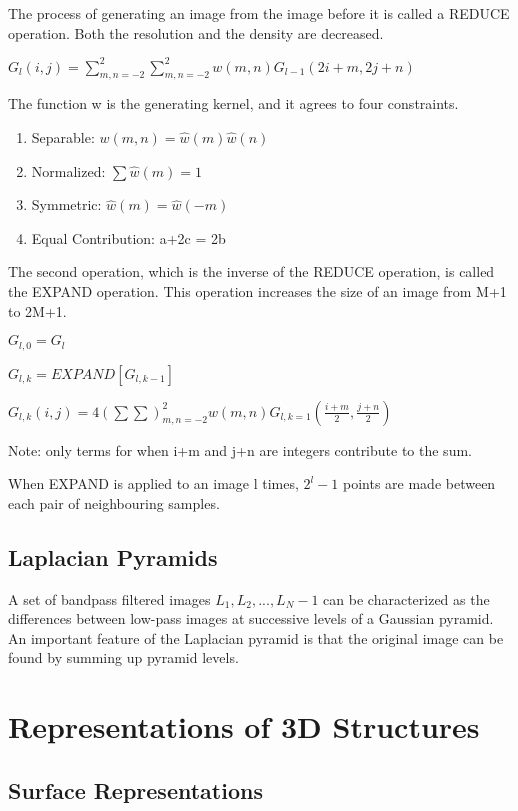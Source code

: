 \documentclass{article}
\begin{document}
\begin{multicols}{2}
The process of generating an image from the image before it is called a REDUCE operation. Both the resolution and the density are decreased.

$G_l(i,j) = \sum _{m,n = -2}^2 \sum _{m,n = -2}^2 w(m,n) G_{l-1} (2i+m, 2j+n)$

The function w is the generating kernel, and it agrees to four constraints.

\begin{enumerate}
  \item {Separable: $w(m,n) = \hat{w}(m)\hat{w}(n)$}
  \item {Normalized: $\sum \hat{w}(m) = 1$}
  \item {Symmetric: $\hat{w}(m) = \hat{w}(-m)$}
  \item {Equal Contribution: a+2c = 2b}
\end{enumerate}

The second operation, which is the inverse of the REDUCE operation, is called the EXPAND operation. This operation increases the size of an image from M+1 to 2M+1.

$G_{l,0} = G_l$

$G_{l,k} = EXPAND[G_{l,k-1}]$

$G_{l,k}(i,j) = 4(\sum \sum)_{m,n = -2}^2 w(m,n) G_{l,k=1}(\frac{i+m}{2}, \frac{j+n}{2})$ 

Note: only terms for when i+m and j+n are integers contribute to the sum.

When EXPAND is applied to an image l times, $2^l-1$ points are made between each pair of neighbouring samples.

\subsection{Laplacian Pyramids}

A set of bandpass filtered images $L_1, L_2, ..., L_N-1$ can be characterized as the differences between low-pass images at successive levels of a Gaussian pyramid. An important feature of the Laplacian pyramid is that the original image can be found by summing up pyramid levels.

\section{Representations of 3D Structures}
\subsection{Surface Representations}

\end{multicols}
\end{document}
